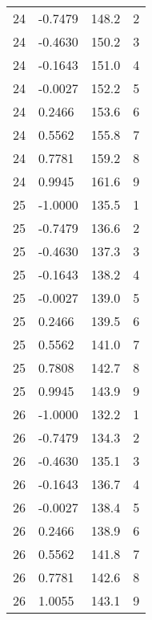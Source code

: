 \documentclass[11pt]{article}
\begin{document}
\begin{tabular}{llll}
	 24 & -0.7479 & 148.2 & 2\\
	 24 & -0.4630 & 150.2 & 3\\
	 24 & -0.1643 & 151.0 & 4\\
	 24 & -0.0027 & 152.2 & 5\\
	 24 &  0.2466 & 153.6 & 6\\
	 24 &  0.5562 & 155.8 & 7\\
	 24 &  0.7781 & 159.2 & 8\\
	 24 &  0.9945 & 161.6 & 9\\
	 25 & -1.0000 & 135.5 & 1\\
	 25 & -0.7479 & 136.6 & 2\\
	 25 & -0.4630 & 137.3 & 3\\
	 25 & -0.1643 & 138.2 & 4\\
	 25 & -0.0027 & 139.0 & 5\\
	 25 &  0.2466 & 139.5 & 6\\
	 25 &  0.5562 & 141.0 & 7\\
	 25 &  0.7808 & 142.7 & 8\\
	 25 &  0.9945 & 143.9 & 9\\
	 26 & -1.0000 & 132.2 & 1\\
	 26 & -0.7479 & 134.3 & 2\\
	 26 & -0.4630 & 135.1 & 3\\
	 26 & -0.1643 & 136.7 & 4\\
	 26 & -0.0027 & 138.4 & 5\\
	 26 &  0.2466 & 138.9 & 6\\
	 26 &  0.5562 & 141.8 & 7\\
	 26 &  0.7781 & 142.6 & 8\\
	 26 &  1.0055 & 143.1 & 9\\
\end{tabular}


    
    \begin{center}
    \end{center}
    { \hspace*{\fill} \\}
    
\end{document}
